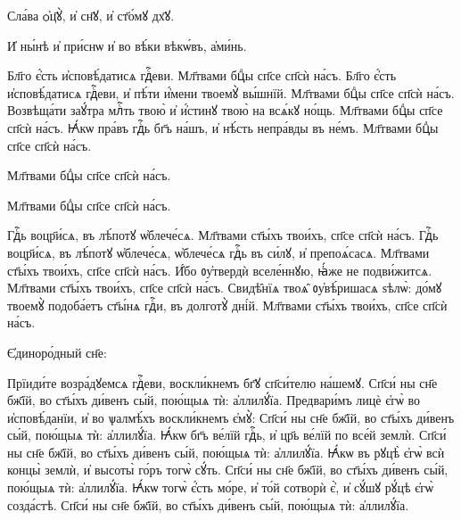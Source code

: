 \hKv Сла́ва ѻ҆ц҃ꙋ̀, и҆ сн҃ꙋ, и҆ ст҃о́мꙋ дх҃ꙋ.  

\hKv И҆ ны́нѣ и҆ при́снѡ и҆ во вѣ́ки вѣкѡ́въ, а҆ми́нь. 

%

\hKv Бл҃го є҆́сть и҆сповѣ́датисѧ гдⷭ҇еви.  
%
\hKv Мл҃твами бцⷣы сп҃се сп҃сѝ на́съ.  
%
 Бл҃го є҆́сть и҆сповѣ́датисѧ гдⷭ҇еви, и҆ пѣ́ти  и҆́мени твоемꙋ̀ вы́шнїй.
%
\hKv Мл҃твами бцⷣы сп҃се сп҃сѝ на́съ.  
%
 Возвѣща́ти заꙋ́тра млⷭ҇ть твою̀ и҆ и҆́стинꙋ твою̀  на всѧ́кꙋ но́щь.
%
\hKv Мл҃твами бцⷣы сп҃се сп҃сѝ на́съ.  
%
 Ꙗ҆́кѡ пра́въ гдⷭ҇ь бг҃ъ на́шъ, и҆ нѣ́сть непра́вды  въ не́мъ.
%
\hKv Мл҃твами бцⷣы сп҃се сп҃сѝ на́съ.  

 Мл҃твами бцⷣы сп҃се сп҃сѝ на́съ.

 Мл҃твами бцⷣы сп҃се сп҃сѝ на́съ.

 Гдⷭ҇ь воцр҃и́сѧ, въ лѣ́потꙋ ѡ҆блече́сѧ.  
%
\hKv Мл҃твами ст҃ы́хъ твои́хъ, сп҃се сп҃сѝ на́съ. 
%
 \hKv Гдⷭ҇ь воцр҃и́сѧ, въ лѣ́потꙋ ѡ҆блече́сѧ, ѡ҆блече́сѧ  гдⷭ҇ь въ си́лꙋ, и҆ препоѧ́сасѧ.
%
\hKv Мл҃твами ст҃ы́хъ твои́хъ, сп҃се сп҃сѝ на́съ. 
%
 И҆́бо ᲂу҆твердѝ вселе́ннꙋю, ꙗ҆́же не подви́житсѧ.
%
\hKv Мл҃твами ст҃ы́хъ твои́хъ, сп҃се сп҃сѝ на́съ. 
%
 Свидѣ̑нїѧ твоѧ̑ ᲂу҆вѣ́ришасѧ ѕѣлѡ̀: до́мꙋ  твоемꙋ̀ подоба́етъ ст҃ы́нѧ гдⷭ҇и, въ долготꙋ̀ дні́й.
%
\hKv Мл҃твами ст҃ы́хъ твои́хъ, сп҃се сп҃сѝ на́съ. 

 Є҆диноро́дный сн҃е: 
%

\hKv Прїиди́те возра́дꙋемсѧ гдⷭ҇еви, воскли́кнемъ бг҃ꙋ сп҃си́телю  на́шемꙋ.   
%
\hKv Сп҃си́ ны сн҃е бж҃їй, во ст҃ы́хъ ди́венъ сы́й,  пою́щыѧ тѝ: а҆ллилꙋ́їа. 
%
 \hKv Предвари́мъ лицѐ є҆гѡ̀ во и҆сповѣ́данїи, и҆ во  ѱалмѣ́хъ воскли́кнемъ є҆мꙋ̀:
%
\hKv Сп҃си́ ны сн҃е бж҃їй, во ст҃ы́хъ ди́венъ сы́й,  пою́щыѧ тѝ: а҆ллилꙋ́їа. 
%
 Ꙗ҆́кѡ бг҃ъ ве́лїй гдⷭ҇ь, и҆ цр҃ь ве́лїй по все́й  землѝ. 
%
\hKv Сп҃си́ ны сн҃е бж҃їй, во ст҃ы́хъ ди́венъ сы́й,  пою́щыѧ тѝ: а҆ллилꙋ́їа. 
%
 Ꙗ҆́кѡ въ рꙋцѣ̀ є҆гѡ̀ всѝ концы̀ землѝ, и҆  высоты̀ го́ръ тогѡ̀ сꙋ́ть.
%
\hKv Сп҃си́ ны сн҃е бж҃їй, во ст҃ы́хъ ди́венъ сы́й,  пою́щыѧ тѝ: а҆ллилꙋ́їа. 
%
 Ꙗ҆́кѡ тогѡ̀ є҆́сть мо́ре, и҆ то́й сотворѝ є҆̀,  и҆ сꙋ́шꙋ рꙋ́цѣ є҆гѡ̀ созда́стѣ. 
%
\hKv Сп҃си́ ны сн҃е бж҃їй, во ст҃ы́хъ ди́венъ сы́й,  пою́щыѧ тѝ: а҆ллилꙋ́їа. 

